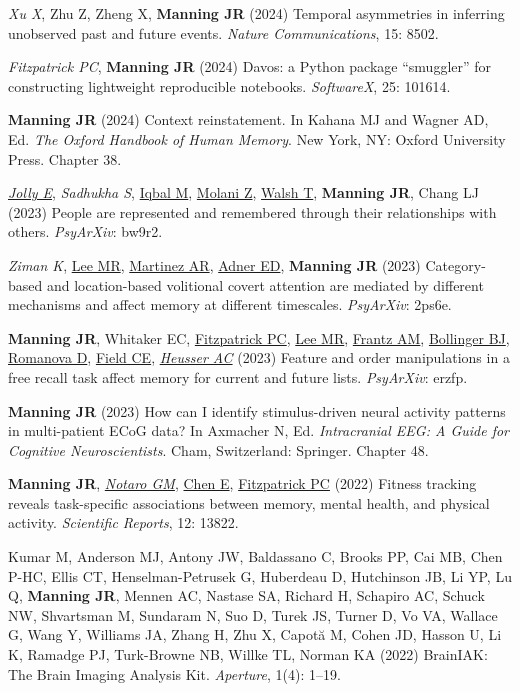 \documentclass[11pt, a4paper]{article} %
\begin{document}
\begin{etaremune}
\item \textit{Xu X}, Zhu Z, Zheng X, \textbf{Manning JR} (2024) Temporal asymmetries in inferring unobserved past and future events. \textit{Nature Communications}, 15: 8502.

\item \textit{Fitzpatrick PC}, \textbf{Manning JR} (2024) Davos: a Python package ``smuggler'' for constructing lightweight reproducible notebooks. \textit{SoftwareX}, 25: 101614.

\item \textbf{Manning JR} (2024) Context reinstatement. In Kahana MJ and Wagner AD, Ed. \textit{The Oxford Handbook of Human Memory}. New York, NY: Oxford University Press. Chapter 38.

\item \ul{\textit{Jolly E}}, \textit{Sadhukha S}, \ul{Iqbal M}, \ul{Molani Z}, \ul{Walsh T}, \textbf{Manning JR}, Chang LJ (2023) People are represented and remembered through their relationships with others. \textit{PsyArXiv}: bw9r2.

\item \textit{Ziman K}, \ul{Lee MR}, \ul{Martinez AR}, \ul{Adner ED}, \textbf{Manning JR} (2023) Category-based and location-based volitional covert attention are mediated by different mechanisms and affect memory at different timescales. \textit{PsyArXiv}: 2ps6e.

\item \textbf{Manning JR}, Whitaker EC, \ul{Fitzpatrick PC}, \ul{Lee MR}, \ul{Frantz AM}, \ul{Bollinger BJ}, \ul{Romanova D}, \ul{Field CE}, \ul{\textit{Heusser AC}} (2023) Feature and order manipulations in a free recall task affect memory for current and future lists. \textit{PsyArXiv}: erzfp.

\item \textbf{Manning JR} (2023) How can I identify stimulus-driven neural activity patterns in multi-patient ECoG data? In Axmacher N, Ed. \textit{Intracranial EEG: A Guide for Cognitive Neuroscientists}. Cham, Switzerland: Springer. Chapter 48.

\item \textbf{Manning JR}, \ul{\textit{Notaro GM}}, \ul{Chen E}, \ul{Fitzpatrick PC} (2022) Fitness tracking reveals task-specific associations between memory, mental health, and physical activity. \textit{Scientific Reports}, 12: 13822.

\item Kumar M, Anderson MJ, Antony JW, Baldassano C, Brooks PP, Cai MB, Chen P-HC, Ellis CT, Henselman-Petrusek G, Huberdeau D, Hutchinson JB, Li YP, Lu Q, \textbf{Manning JR}, Mennen AC, Nastase SA, Richard H, Schapiro AC, Schuck NW, Shvartsman M, Sundaram N, Suo D, Turek JS, Turner D, Vo VA, Wallace G, Wang Y, Williams JA, Zhang H, Zhu X, Capotă M, Cohen JD, Hasson U, Li K, Ramadge PJ, Turk-Browne NB, Willke TL, Norman KA (2022) BrainIAK: The Brain Imaging Analysis Kit. \textit{Aperture}, 1(4): 1--19.


\end{etaremune}
\end{document}
